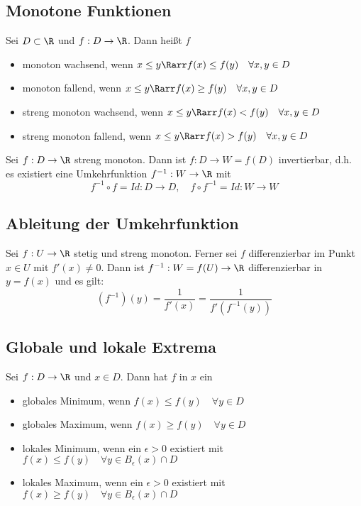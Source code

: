	\subsection{Monotone Funktionen}
		\begin{Definition} [ Monoton]
			Sei $D\subset\R$ und $f: D\to \R$. Dann heißt $f$
		\begin{itemize}
			\item monoton wachsend, wenn $x\leq y \Rarr f(x)\leq f(y) \quad \forall x, y\in D $
			\item monoton fallend, wenn $x\leq y \Rarr f(x)\geq f(y) \quad \forall x, y\in D $
			\item streng monoton wachsend, wenn $x\leq y \Rarr f(x) < f(y) \quad \forall x, y\in D $
			\item streng monoton fallend, wenn $x\leq y \Rarr f(x) > f(y) \quad \forall x, y\in D $
		\end{itemize}
		\end{Definition}
		\begin{Satz} [ ]
			Sei $f: D \to \R$ streng monoton. Dann ist $f: D\to W=f(D)$ invertierbar, d.h. es existiert eine Umkehrfunktion $f^{-1}:W \to \R$ mit 
			$$
				f^{-1}\circ f = Id: D \to D, \quad f \circ f^{-1} = Id: W \to W
			$$
		\end{Satz}
	\subsection{Ableitung der Umkehrfunktion}
		\begin{Satz} [ ]
			Sei $f: U\to \R$ stetig und streng monoton. Ferner sei $f$ differenzierbar im Punkt $x\in U$ mit $f'(x)\not = 0$. Dann ist $f^{-1}: W = f(U)\to \R$ differenzierbar in $y=f(x)$ und es gilt:
			$$
				(f^{-1})(y)=\frac{1}{f'(x)}=\frac{1}{f'(f^{-1}(y))}
			$$
		\end{Satz}
	\subsection{Globale und lokale Extrema}
		\begin{Definition} [ Extrema]
			Sei $f: D\to\R$ und $x\in D$. Dann hat $f$ in $x$ ein
			\begin{itemize}
				\item globales Minimum, wenn $f(x)\leq f(y) \quad \forall y\in D$
				\item globales Maximum, wenn $f(x)\geq f(y) \quad \forall y\in D$
				\item lokales Minimum, wenn ein $\epsilon > 0$ existiert mit $f(x)\leq f(y) \quad \forall y \in B_\epsilon(x) \cap D$
				\item lokales Maximum, wenn ein $\epsilon > 0$ existiert mit $f(x)\geq f(y) \quad \forall y \in B_\epsilon(x) \cap D$
			\end{itemize}
		\end{Definition}
